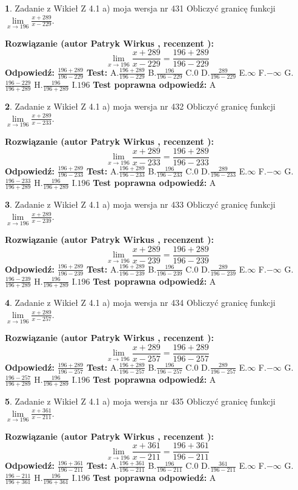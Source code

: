\documentclass[12pt, a4paper]{article}
\theoremstyle{definition} %
\newtheorem{zad}{}
\newcommand{\zadStart}[1]{\begin{zad}#1\newline}
\newcommand{\zadStop}{\end{zad}}
\newcommand{\rozwStart}[2]{\noindent \textbf{Rozwiązanie (autor #1 , recenzent #2): }\newline}
\newcommand{\rozwStop}{\newline}
\newcommand{\odpStart}{\noindent \textbf{Odpowiedź:}\newline}
\newcommand{\odpStop}{\newline}
\newcommand{\testStart}{\noindent \textbf{Test:}\newline}
\newcommand{\testStop}{\newline}
\newcommand{\kluczStart}{\noindent \textbf{Test poprawna odpowiedź:}\newline}
\newcommand{\kluczStop}{\newline}
\begin{document}
\zadStart{Zadanie z Wikieł Z 4.1 a) moja wersja nr 431}
Obliczyć granicę funkcji $\lim\limits_{x\to196}\frac{x+289}{x-229}$.
\zadStop
\rozwStart{Patryk Wirkus}{}
$$\lim\limits_{x\to196}\frac{x+289}{x-229} = \frac{196+289}{196-229}$$
\rozwStop
\odpStart
$\frac{196+289}{196-229}$
\odpStop
\testStart
A.$\frac{196+289}{196-229}$
B.$\frac{196}{196-229}$
C.$0$
D.$\frac{289}{196-229}$
E.$\infty$
F.$-\infty$
G.$\frac{196-229}{196+289}$
H.$\frac{196}{196+289}$
I.$196$
\testStop
\kluczStart
A
\kluczStop



\zadStart{Zadanie z Wikieł Z 4.1 a) moja wersja nr 432}
Obliczyć granicę funkcji $\lim\limits_{x\to196}\frac{x+289}{x-233}$.
\zadStop
\rozwStart{Patryk Wirkus}{}
$$\lim\limits_{x\to196}\frac{x+289}{x-233} = \frac{196+289}{196-233}$$
\rozwStop
\odpStart
$\frac{196+289}{196-233}$
\odpStop
\testStart
A.$\frac{196+289}{196-233}$
B.$\frac{196}{196-233}$
C.$0$
D.$\frac{289}{196-233}$
E.$\infty$
F.$-\infty$
G.$\frac{196-233}{196+289}$
H.$\frac{196}{196+289}$
I.$196$
\testStop
\kluczStart
A
\kluczStop



\zadStart{Zadanie z Wikieł Z 4.1 a) moja wersja nr 433}
Obliczyć granicę funkcji $\lim\limits_{x\to196}\frac{x+289}{x-239}$.
\zadStop
\rozwStart{Patryk Wirkus}{}
$$\lim\limits_{x\to196}\frac{x+289}{x-239} = \frac{196+289}{196-239}$$
\rozwStop
\odpStart
$\frac{196+289}{196-239}$
\odpStop
\testStart
A.$\frac{196+289}{196-239}$
B.$\frac{196}{196-239}$
C.$0$
D.$\frac{289}{196-239}$
E.$\infty$
F.$-\infty$
G.$\frac{196-239}{196+289}$
H.$\frac{196}{196+289}$
I.$196$
\testStop
\kluczStart
A
\kluczStop



\zadStart{Zadanie z Wikieł Z 4.1 a) moja wersja nr 434}
Obliczyć granicę funkcji $\lim\limits_{x\to196}\frac{x+289}{x-257}$.
\zadStop
\rozwStart{Patryk Wirkus}{}
$$\lim\limits_{x\to196}\frac{x+289}{x-257} = \frac{196+289}{196-257}$$
\rozwStop
\odpStart
$\frac{196+289}{196-257}$
\odpStop
\testStart
A.$\frac{196+289}{196-257}$
B.$\frac{196}{196-257}$
C.$0$
D.$\frac{289}{196-257}$
E.$\infty$
F.$-\infty$
G.$\frac{196-257}{196+289}$
H.$\frac{196}{196+289}$
I.$196$
\testStop
\kluczStart
A
\kluczStop



\zadStart{Zadanie z Wikieł Z 4.1 a) moja wersja nr 435}
Obliczyć granicę funkcji $\lim\limits_{x\to196}\frac{x+361}{x-211}$.
\zadStop
\rozwStart{Patryk Wirkus}{}
$$\lim\limits_{x\to196}\frac{x+361}{x-211} = \frac{196+361}{196-211}$$
\rozwStop
\odpStart
$\frac{196+361}{196-211}$
\odpStop
\testStart
A.$\frac{196+361}{196-211}$
B.$\frac{196}{196-211}$
C.$0$
D.$\frac{361}{196-211}$
E.$\infty$
F.$-\infty$
G.$\frac{196-211}{196+361}$
H.$\frac{196}{196+361}$
I.$196$
\testStop
\kluczStart
A
\kluczStop
\end{document}
